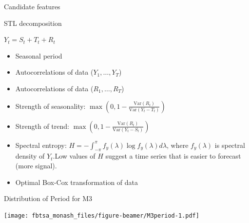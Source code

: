 \documentclass[14pt,ignorenonframetext,]{beamer}
\providecommand{\tightlist}{%
  \setlength{\itemsep}{0pt}\setlength{\parskip}{0pt}}
\def\Var{\text{Var}}
\begin{document}
\begin{frame}{Candidate features}
\protect\hypertarget{candidate-features}{}

\begin{block}{STL decomposition}
\centerline{$Y_t = S_t + T_t + R_t$}
\end{block}\pause\fontsize{14}{16}\sf\vspace*{-0.2cm}

\begin{itemize}
\tightlist
\item
  Seasonal period
\item
  Autocorrelations of data (\(Y_1,\dots,Y_T\))
\item
  Autocorrelations of data (\(R_1,\dots,R_T\))
\item
  Strength of seasonality:
  \(\max\left(0,1 - \frac{\Var(R_t)}{\Var(Y_t-T_t)}\right)\)
\item
  Strength of trend:
  \(\max\left(0,1 - \frac{\Var(R_t)}{\Var(Y_t-S_t)}\right)\)
\item
  Spectral entropy:
  \(H = - \int_{-\pi}^{\pi} f_y(\lambda) \log f_y(\lambda) d\lambda\),
  where \(f_y(\lambda)\) is spectral density of \(Y_t\).\newline Low
  values of \(H\) suggest a time series that is easier to forecast (more
  signal).
\item
  Optimal Box-Cox transformation of data
\end{itemize}

\fontsize{9}{10}\sf

\end{frame}

\begin{frame}{Distribution of Period for M3}
\protect\hypertarget{distribution-of-period-for-m3}{}

\texttt{[image: fbtsa\_monash\_files/figure-beamer/M3period-1.pdf]}

\end{frame}
\end{document}
